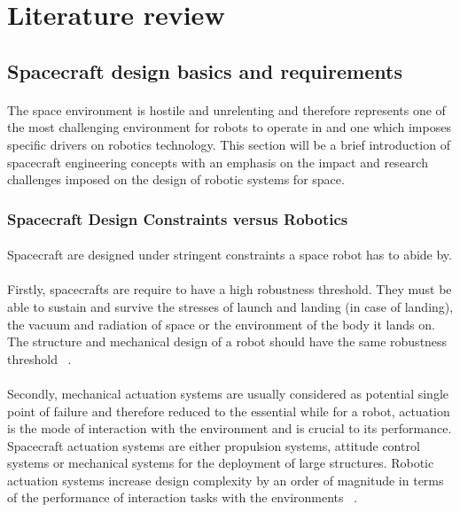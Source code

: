 \section{Literature review}
\subsection{Spacecraft design basics and requirements}
\paragraph{}The space environment is hostile and unrelenting and therefore represents one of the most challenging environment for robots to operate in and one which imposes specific drivers on robotics technology. This section will be a brief introduction of spacecraft engineering concepts with an emphasis on the impact and research challenges imposed on the design of robotic systems for space.
\subsubsection{Spacecraft Design Constraints versus Robotics}
\paragraph{}Spacecraft are designed under stringent constraints a space robot has to abide by.
\paragraph{}Firstly, spacecrafts are require to have a high robustness threshold. They must be able to sustain and survive the stresses of launch and landing (in case of landing), the vacuum and radiation of space or the environment of the body it lands on. The structure and mechanical design of a robot should have the same robustness threshold ~\cite{Ellery2003}.
\paragraph{}Secondly, mechanical actuation systems are usually considered as potential single point of failure and therefore reduced to the essential while for a robot, actuation is the mode of interaction with the environment and is crucial to its performance. Spacecraft actuation systems are either propulsion systems, attitude control systems or mechanical systems for the deployment of large structures. Robotic actuation systems increase design complexity by an order of magnitude in terms of the performance of interaction tasks with the environments ~\cite{Ellery2003}.
